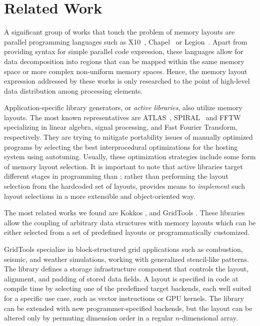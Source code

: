 \section{Related Work}\label{sec:relwork}

A significant group of works that touch the problem of memory layouts are parallel programming languages such as X10~\cite{charles2005x10}, Chapel~\cite{chamberlain2007parallel} or Legion~\cite{bauer2012legion}. Apart from providing syntax for simple parallel code expression, these languages allow for data decomposition into regions that can be mapped within the same memory space or more complex non-uniform memory spaces. Hence, the memory layout expression addressed by these works is only researched to the point of high-level data distribution among processing elements.

Application-specific library generators, or \emph{active libraries}, also utilize memory layouts. The most known representatives are ATLAS~\cite{whaley1998automatically}, SPIRAL~\cite{puschel2004spiral} and FFTW~\cite{frigo1998fftw} specializing in linear algebra, signal processing, and Fast Fourier Transform, respectively. They are trying to mitigate portability issues of manually optimized programs by selecting the best interprocedural optimizations for the hosting system using autotuning. Usually, these optimization strategies include some form of memory layout selection. It is important to note that active libraries target different stages in programming than \Noarr{}; rather than performing the layout selection from the hardcoded set of layouts, \Noarr{} provides means to \emph{implement} such layout selections in a more extensible and object-oriented way.

The most related works we found are Kokkos \cite{9485033}, and GridTools \cite{AFANASYEV2021100707}. These libraries allow the coupling of arbitrary data structures with memory layouts which can be either selected from a set of predefined layouts or programmatically customized.

GridTools specialize in block-structured grid applications such as combustion, seismic, and weather simulations, working with generalized stencil-like patterns. The library defines a storage infrastructure component that controls the layout, alignment, and padding of stored data fields. A layout is specified in code at compile time by selecting one of the predefined target backends, each well suited for a specific use case, such as vector instructions or GPU kernels. The library can be extended with new programmer-specified backends, but the layout can be altered only by permuting dimension order in a regular $n$-dimensional array. 

